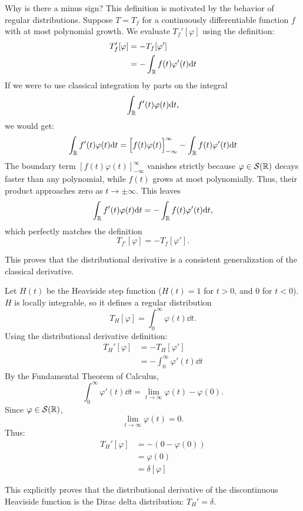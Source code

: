 \begin{remark}
Why is there a minus sign? This definition is motivated by the behavior of regular distributions. Suppose $T = T_f$ for a continuously differentiable function $f$ with at most polynomial growth. We evaluate $T_f'[\varphi]$ using the definition:
\begin{equation}
\begin{aligned}
T_f'[\varphi] &= -T_f[\varphi'] \\
&= -\int_{\mathbb{R}} f(t) \varphi'(t) \mathrm{d} t
\end{aligned}
\end{equation}
If we were to use classical integration by parts on the integral \[
\int_{\mathbb{R}} f'(t) \varphi(t) \mathrm{d} t,
\] we would get:
\begin{equation}
\int_{\mathbb{R}} f'(t) \varphi(t) \mathrm{d} t = \Big[ f(t)\varphi(t) \Big]_{-\infty}^\infty - \int_{\mathbb{R}} f(t) \varphi'(t) \mathrm{d} t
\end{equation}
The boundary term $[ f(t)\varphi(t) ]_{-\infty}^\infty$ vanishes strictly because $\varphi \in \mathcal{S}(\mathbb{R})$ decays faster than any polynomial, while $f(t)$ grows at most polynomially. Thus, their product approaches zero as $t \to \pm \infty$.
This leaves
\[
\int_{\mathbb{R}} f'(t) \varphi(t) \mathrm{d} t = -\int_{\mathbb{R}} f(t) \varphi'(t) \mathrm{d} t,
\]
which perfectly matches the definition
\[
T_{f'}[\varphi] = -T_f[\varphi'].
\]

This proves that the distributional derivative is a consistent generalization of the classical derivative.
\end{remark}

\begin{remark}
Let $H(t)$ be the Heaviside step function ($H(t) = 1$ for $t > 0$, and $0$ for $t < 0$). $H$ is locally integrable, so it defines a regular distribution
\[
T_H[\varphi] = \int_0^\infty \varphi(t) \dd t.
\]
Using the distributional derivative definition:
\begin{equation}
\begin{aligned}
T_H'[\varphi] &= -T_H[\varphi'] \\
&= -\int_0^\infty \varphi'(t) \dd t
\end{aligned}
\end{equation}
By the Fundamental Theorem of Calculus,
\[
\int_0^\infty \varphi'(t) \dd t = \lim_{t \to \infty} \varphi(t) - \varphi(0).
\]
Since $\varphi \in \mathcal{S}(\mathbb{R})$,
\[
\lim_{t \to \infty} \varphi(t) = 0.
\]
Thus:
\begin{equation}
\begin{aligned}
T_H'[\varphi] &= -(0 - \varphi(0)) \\
&= \varphi(0) \\
&= \delta[\varphi]
\end{aligned}
\end{equation}

This explicitly proves that the distributional derivative of the discontinuous Heaviside function is the Dirac delta distribution: $T_H' = \delta$.
\end{remark}

